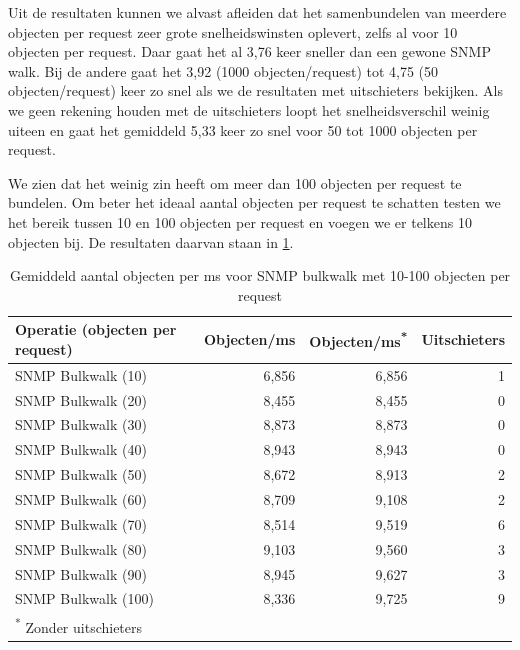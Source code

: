 Uit de resultaten kunnen we alvast afleiden dat het samenbundelen van meerdere objecten per request zeer grote snelheidswinsten oplevert,
zelfs al voor 10 objecten per request.
Daar gaat het al 3,76 keer sneller dan een gewone SNMP walk.
Bij de andere gaat het 3,92 (1000 objecten/request) tot 4,75 (50 objecten/request) keer zo snel als we de resultaten met uitschieters bekijken.
Als we geen rekening houden met de uitschieters loopt het snelheidsverschil weinig uiteen en
gaat het gemiddeld 5,33 keer zo snel voor 50 tot 1000 objecten per request.

We zien dat het weinig zin heeft om meer dan 100 objecten per request te bundelen.
Om beter het ideaal aantal objecten per request te schatten testen we het bereik tussen 10 en 100 objecten per request en voegen we er telkens 10 objecten bij.
De resultaten daarvan staan in \cref{tabel-bulkrequests-bulksizes}.

\begin{table}[h]
\centering
\begin{tabular}{@{}lrrr@{}}
\toprule
Operatie (objecten per request) & Objecten/ms & Objecten/ms\textsuperscript{*} & Uitschieters \\ \midrule
SNMP Bulkwalk (10)              & 6,856       & 6,856         & 1            \\
SNMP Bulkwalk (20)              & 8,455       & 8,455         & 0            \\
SNMP Bulkwalk (30)              & 8,873       & 8,873         & 0            \\
SNMP Bulkwalk (40)              & 8,943       & 8,943         & 0            \\
SNMP Bulkwalk (50)              & 8,672       & 8,913         & 2            \\
SNMP Bulkwalk (60)              & 8,709       & 9,108         & 2            \\
SNMP Bulkwalk (70)              & 8,514       & 9,519         & 6            \\
SNMP Bulkwalk (80)              & 9,103       & 9,560         & 3            \\
SNMP Bulkwalk (90)              & 8,945       & 9,627         & 3            \\
SNMP Bulkwalk (100)             & 8,336       & 9,725         & 9            \\ \midrule[.5pt]
\multicolumn{4}{l}{\textsuperscript{*} \footnotesize{Zonder uitschieters}}
\end{tabular}
\caption{Gemiddeld aantal objecten per ms voor SNMP bulkwalk met 10-100 objecten per request}
\label{tabel-bulkrequests-bulksizes}
\end{table}

